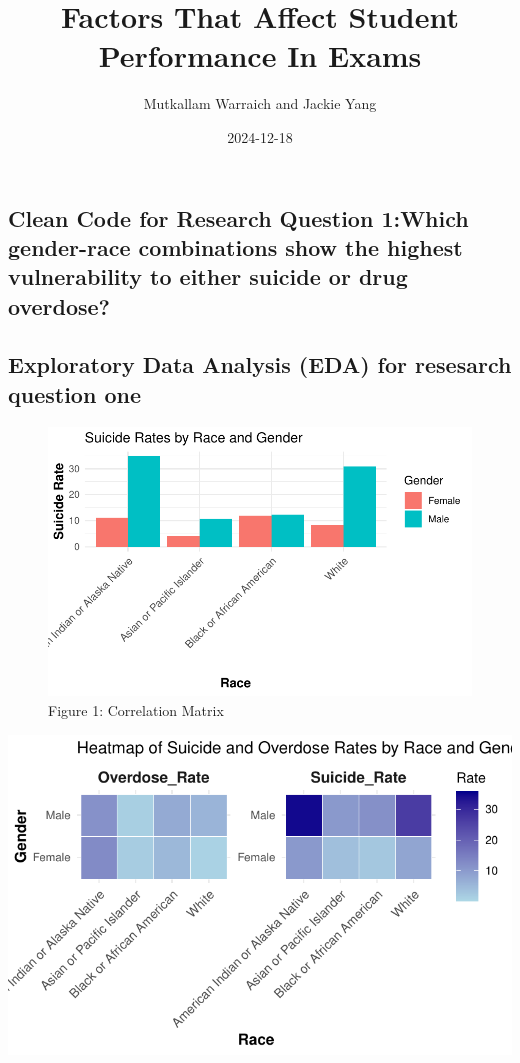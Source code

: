 \documentclass[
  letterpaper,
  DIV=11,
  numbers=noendperiod]{scrartcl}
\title{Factors That Affect Student Performance In Exams}
\author{Mutkallam Warraich and Jackie Yang}
\date{2024-12-18}
\renewcommand*\contentsname{Table of contents}
\newcommand\contentsname{Table of contents}
\begin{document}
\maketitle

\renewcommand*\contentsname{Table of contents}
{
\hypersetup{linkcolor=}
\setcounter{tocdepth}{3}
\tableofcontents
}
\subsection{Clean Code for Research Question 1:Which gender-race
combinations show the highest vulnerability to either suicide or drug
overdose?}\label{clean-code-for-research-question-1which-gender-race-combinations-show-the-highest-vulnerability-to-either-suicide-or-drug-overdose}

\subsection{Exploratory Data Analysis (EDA) for resesarch question
one}\label{exploratory-data-analysis-eda-for-resesarch-question-one}

\begin{figure}[H]

{\centering \includegraphics{Sec4_Team10_files/figure-pdf/unnamed-chunk-7-1.pdf}

}

\caption{Figure 1: Correlation Matrix}

\end{figure}%

\includegraphics{Sec4_Team10_files/figure-pdf/unnamed-chunk-8-1.pdf}
\end{document}
